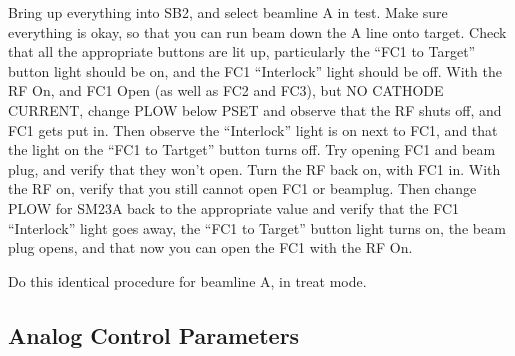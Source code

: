 \documentclass[11pt]{book}		%
\begin{document}
Bring up everything into SB2, and select beamline A in test. Make sure everything is okay, so that you can run beam down the A line onto target. Check that all the appropriate buttons are lit up, particularly the ``FC1 to Target'' button light should be on, and the FC1 ``Interlock'' light should be off. With the RF On, and FC1 Open (as well as FC2 and FC3), but NO CATHODE CURRENT, change PLOW below PSET and observe that the RF shuts off, and FC1 gets put in. Then observe the ``Interlock'' light is on next to FC1, and that the light on the ``FC1 to Tartget'' button turns off. Try opening FC1 and beam plug, and verify that they won't open. Turn the RF back on, with FC1 in. With the RF on, verify that you still cannot open FC1 or beamplug. Then change PLOW for SM23A back to the appropriate value and verify that the FC1 ``Interlock'' light goes away, the ``FC1 to Target'' button light turns on, the beam plug opens, and that now you can open the FC1 with the RF On.

Do this identical procedure for beamline A, in treat mode.

\color{black}


\subsection{Analog Control Parameters}\label{sect:cyc-equip-ctl-beamline-sm23a-analog-control}
\end{document}
